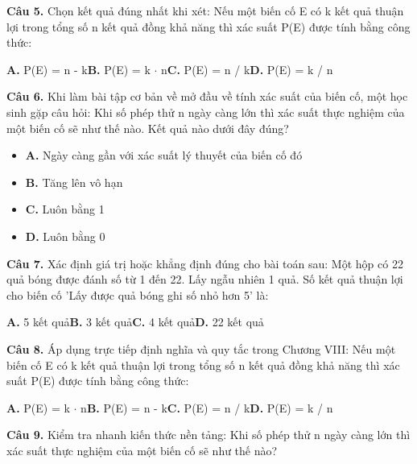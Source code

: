 \documentclass[11pt,a4paper]{article}
\begin{document}
\textbf{\color{primary} Câu 5.} Chọn kết quả đúng nhất khi xét: Nếu một biến cố E có k kết quả thuận lợi trong tổng số n kết quả đồng khả năng thì xác suất P(E) được tính bằng công thức:\par
\hspace*{1.5em}\textbf{A.} P(E) = n - k\quad\quad \textbf{B.} P(E) = k $\cdot$ n\quad\quad \textbf{C.} P(E) = n / k\quad\quad \textbf{D.} P(E) = k / n\par\vspace{2pt}
\textbf{\color{primary} Câu 6.} Khi làm bài tập cơ bản về mở đầu về tính xác suất của biến cố, một học sinh gặp câu hỏi: Khi số phép thử n ngày càng lớn thì xác suất thực nghiệm của một biến cố sẽ như thế nào. Kết quả nào dưới đây đúng?\par
\begin{itemize}\setlength{\itemsep}{1pt}\setlength{\parskip}{0pt}
  \item[] \textbf{A.} Ngày càng gần với xác suất lý thuyết của biến cố đó
  \item[] \textbf{B.} Tăng lên vô hạn
  \item[] \textbf{C.} Luôn bằng 1
  \item[] \textbf{D.} Luôn bằng 0
\end{itemize}\vspace{2pt}
\textbf{\color{primary} Câu 7.} Xác định giá trị hoặc khẳng định đúng cho bài toán sau: Một hộp có 22 quả bóng được đánh số từ 1 đến 22. Lấy ngẫu nhiên 1 quả. Số kết quả thuận lợi cho biến cố 'Lấy được quả bóng ghi số nhỏ hơn 5' là:\par
\hspace*{1.5em}\textbf{A.} 5 kết quả\quad\quad \textbf{B.} 3 kết quả\quad\quad \textbf{C.} 4 kết quả\quad\quad \textbf{D.} 22 kết quả\par\vspace{2pt}
\textbf{\color{primary} Câu 8.} Áp dụng trực tiếp định nghĩa và quy tắc trong Chương VIII: Nếu một biến cố E có k kết quả thuận lợi trong tổng số n kết quả đồng khả năng thì xác suất P(E) được tính bằng công thức:\par
\hspace*{1.5em}\textbf{A.} P(E) = k $\cdot$ n\quad\quad \textbf{B.} P(E) = n - k\quad\quad \textbf{C.} P(E) = n / k\quad\quad \textbf{D.} P(E) = k / n\par\vspace{2pt}
\textbf{\color{primary} Câu 9.} Kiểm tra nhanh kiến thức nền tảng: Khi số phép thử n ngày càng lớn thì xác suất thực nghiệm của một biến cố sẽ như thế nào?\par
\end{document}

